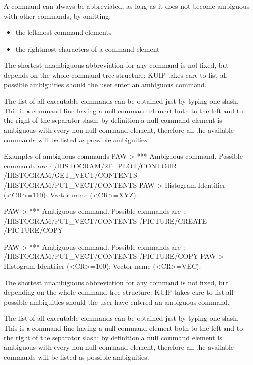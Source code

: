 A command can always be abbreviated, as long as it does not become
ambiguous with other commands, by omitting:

\begin{itemize}
\item the leftmost command elements
\item the rightmost characters of a command element
\end{itemize}

The shortest unambiguous abbreviation for any command is not fixed,
but depends on the whole command tree structure: KUIP takes care to list
all possible ambiguities should the user enter an ambiguous command.

The list of all executable commands can be obtained just by typing
one slash. This is a command line having a null
command element both to the left and to the right of the separator slash;
by definition a null command element is ambiguous with every non-null
command element, therefore all the available commands will be listed as
possible ambiguities.

\begin{XMPt}{Examples of ambiguous commands}
PAW > 
*** Ambiguous command. Possible commands are :
/HISTOGRAM/2D_PLOT/CONTOUR
/HISTOGRAM/GET_VECT/CONTENTS
/HISTOGRAM/PUT_VECT/CONTENTS
PAW > 
Histogram Identifier (<CR>=110): 
Vector name (<CR>=XYZ): 

PAW > 
*** Ambiguous command. Possible commands are :
/HISTOGRAM/PUT_VECT/CONTENTS
/PICTURE/CREATE
/PICTURE/COPY
 
PAW > 
*** Ambiguous command. Possible commands are :
/HISTOGRAM/PUT_VECT/CONTENTS
/PICTURE/COPY
PAW > 
Histogram Identifier (<CR>=100): 
Vector name (<CR>=VEC): 
\end{XMPt}

The shortest unambiguous abbreviation for any command is not fixed,
but depending on the whole command tree structure: KUIP takes care to list
all possible ambiguities should the user have entered an ambiguous command.
 
The list of all executable commands can be obtained just by typing
one slash. This is a command line having a null
command element both to the left and to the right of the separator slash;
by definition a null command element is ambiguous with every non-null
command element, therefore all the available commands will be listed as
possible ambiguities.

